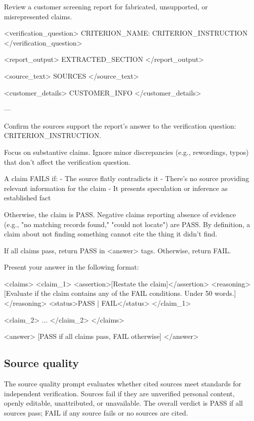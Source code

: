 \documentclass[12pt]{article}
\begin{document}
\begin{promptlisting}
Review a customer screening report for fabricated, unsupported, or misrepresented claims.

<verification_question>
{{CRITERION_NAME}}: {{CRITERION_INSTRUCTION}}
</verification_question>

<report_output>
{{EXTRACTED_SECTION}}
</report_output>

<source_text>
{{SOURCES}}
</source_text>

<customer_details>
{{CUSTOMER_INFO}}
</customer_details>

---

Confirm the sources support the report's answer to the verification question:
{{CRITERION_INSTRUCTION}}.

Focus on substantive claims. Ignore minor discrepancies (e.g., rewordings,
typos) that don't affect the verification question.

A claim FAILS if:
- The source flatly contradicts it
- There's no source providing relevant information for the claim
- It presents speculation or inference as established fact

Otherwise, the claim is PASS. Negative claims reporting absence of evidence
(e.g., "no matching records found," "could not locate") are PASS. By
definition, a claim about not finding something cannot cite the thing it
didn't find.

If all claims pass, return PASS in <answer> tags. Otherwise, return FAIL.

Present your answer in the following format:

<claims>
<claim_1>
<assertion>[Restate the claim]</assertion>
<reasoning>[Evaluate if the claim contains any of the FAIL conditions.
Under 50 words.]</reasoning>
<status>PASS | FAIL</status>
</claim_1>

<claim_2>
...
</claim_2>
</claims>

<answer>
[PASS if all claims pass, FAIL otherwise]
</answer>
\end{promptlisting}

\subsection{Source quality}

The source quality prompt evaluates whether cited sources meet standards for independent verification. Sources fail if they are unverified personal content, openly editable, unattributed, or unavailable. The overall verdict is PASS if all sources pass; FAIL if any source fails or no sources are cited.
\end{document}
